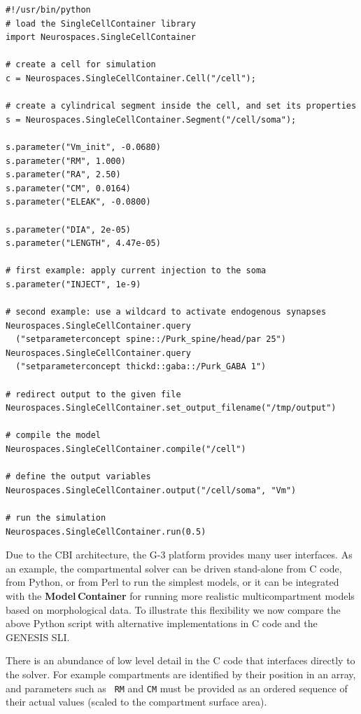 \documentclass[12pt]{article}
\begin{document}
{\vspace*{1mm}
 { \footnotesize
  \linenumbers
  {\begin{verbatim}
#!/usr/bin/python
# load the SingleCellContainer library
import Neurospaces.SingleCellContainer

# create a cell for simulation
c = Neurospaces.SingleCellContainer.Cell("/cell");

# create a cylindrical segment inside the cell, and set its properties
s = Neurospaces.SingleCellContainer.Segment("/cell/soma");

s.parameter("Vm_init", -0.0680)
s.parameter("RM", 1.000)
s.parameter("RA", 2.50)
s.parameter("CM", 0.0164)
s.parameter("ELEAK", -0.0800)

s.parameter("DIA", 2e-05)
s.parameter("LENGTH", 4.47e-05)

# first example: apply current injection to the soma
s.parameter("INJECT", 1e-9)

# second example: use a wildcard to activate endogenous synapses
Neurospaces.SingleCellContainer.query
  ("setparameterconcept spine::/Purk_spine/head/par 25")
Neurospaces.SingleCellContainer.query
  ("setparameterconcept thickd::gaba::/Purk_GABA 1")

# redirect output to the given file
Neurospaces.SingleCellContainer.set_output_filename("/tmp/output")

# compile the model
Neurospaces.SingleCellContainer.compile("/cell")

# define the output variables
Neurospaces.SingleCellContainer.output("/cell/soma", "Vm")
    
# run the simulation
Neurospaces.SingleCellContainer.run(0.5)
\end{verbatim}
  \vspace*{1mm} }}}

Due to the CBI architecture, the G-3 platform provides many user
interfaces.  As an example, the compartmental solver can be driven
stand-alone from C code, from Python, or from Perl to run the simplest
models, or it can be integrated with the {\bf Model\,Container} for
running more realistic multicompartment models based on morphological
data.  To illustrate this flexibility we now compare the above Python
script with alternative implementations in C code and the GENESIS SLI.

There is an abundance of low level detail in the C code that
interfaces directly to the solver.  For example compartments are
identified by their position in an array, and parameters such as {\tt
  RM} and {\tt CM} must be provided as an ordered sequence of their
actual values (scaled to the compartment surface area).
\end{document}
